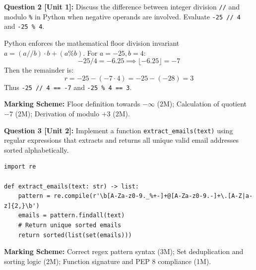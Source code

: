\noindent\textbf{Question 2 [Unit 1]:} Discuss the difference between integer division \texttt{//} and modulo \texttt{\%} in Python when negative operands are involved. Evaluate \texttt{-25 // 4} and \texttt{-25 \% 4}.
\begin{solutionbox}
Python enforces the mathematical floor division invariant $a = (a // b) \cdot b + (a \% b)$.
For $a = -25, b = 4$:
\begin{equation}
-25 / 4 = -6.25 \implies \lfloor -6.25 \rfloor = -7
\end{equation}
Then the remainder is:
\begin{equation}
r = -25 - (-7 \cdot 4) = -25 - (-28) = 3
\end{equation}
Thus \texttt{-25 // 4 == -7} and \texttt{-25 \% 4 == 3}.
\end{solutionbox}
\begin{markingrubric}
\textbf{Marking Scheme:} Floor definition towards $-\infty$ (2M); Calculation of quotient $-7$ (2M); Derivation of modulo $+3$ (2M).
\end{markingrubric}

\noindent\textbf{Question 3 [Unit 2]:} Implement a function \texttt{extract\_emails(text)} using regular expressions that extracts and returns all unique valid email addresses sorted alphabetically.
\begin{solutionbox}
\begin{lstlisting}
import re

def extract_emails(text: str) -> list:
    pattern = re.compile(r'\b[A-Za-z0-9._%+-]+@[A-Za-z0-9.-]+\.[A-Z|a-z]{2,}\b')
    emails = pattern.findall(text)
    # Return unique sorted emails
    return sorted(list(set(emails)))
\end{lstlisting}
\end{solutionbox}
\begin{markingrubric}
\textbf{Marking Scheme:} Correct regex pattern syntax (3M); Set deduplication and sorting logic (2M); Function signature and PEP 8 compliance (1M).
\end{markingrubric}

